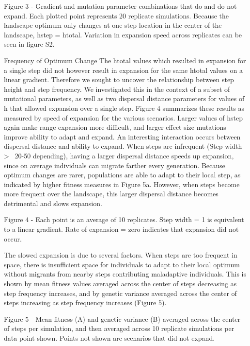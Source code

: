 Figure 3 - Gradient and mutation parameter combinations that do and do not expand. Each 
plotted point represents 20 replicate simulations. Because the landscape optimum only 
changes at one step location in the center of the landscape, hstep = htotal. Variation 
in expansion speed across replicates can be seen in figure S2.

Frequency of Optimum Change
	The htotal values which resulted in expansion for a single step did not however result 
	in expansion for the same htotal values on a linear gradient. Therefore we sought to 
	uncover the relationship between step height and step frequency. We investigated this 
	in the context of a subset of mutational parameters, as well as two dispersal distance 
	parameters for values of h that allowed expansion over a single step.
	Figure 4 summarizes these results as measured by speed of expansion for the various 
	scenarios. Larger values of hstep again make range expansion more difficult, and larger 
	effect size mutations improve ability to adapt and expand. An interesting interaction 
	occurs between dispersal distance and ability to expand. When steps are infrequent 
	(Step width > ~20-50 depending), having a larger dispersal distance speeds up expansion, 
	since on average individuals can migrate farther every generation. Because optimum 
	changes are rarer, populations are able to adapt to their local step, as indicated by 
	higher fitness measures in Figure 5a. However, when steps become more frequent over 
	the landscape, this larger dispersal distance becomes detrimental and slows expansion.
	
Figure 4 - Each point is an average of 10 replicates. Step width = 1 is equivalent to a 
linear gradient. Rate of expansion = zero indicates that expansion did not occur.

The slowed expansion is due to several factors. When steps are too frequent in space, there 
is insufficient space for individuals to adapt to their local optimum without migrants from 
nearby steps contributing maladaptive individuals. This is shown by mean fitness values 
averaged across the center of steps decreasing as step frequency increases, and by genetic 
variance averaged across the center of steps increasing as step frequency increases (Figure 5).

Figure 5 - Mean fitness (A) and genetic variance (B) averaged across the center of steps per 
simulation, and then averaged across 10 replicate simulations per data point shown. Points 
not shown are scenarios that did not expand.

